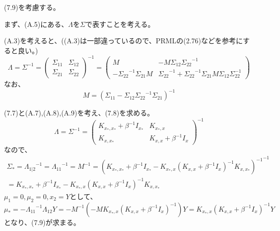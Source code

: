 \documentclass{jsarticle}
\begin{document}
(7.9)を考慮する。

まず、(A.5)にある、$\Lambda$を$\Sigma$で表すことを考える。

(A.3)を考えると、((A.3)は一部違っているので、PRMLの(2.76)などを参考にすると良い。)
\begin{equation}
\Lambda = \Sigma^{-1}
= \begin{pmatrix}
{\Sigma_{11}} & {\Sigma_{12}}\\
{\Sigma_{21}} & {\Sigma_{22}}
\end{pmatrix}^{-1}
= \begin{pmatrix}
M & -M{\Sigma_{12}}{\Sigma_{22}}^{-1}\\
-{\Sigma_{22}}^{-1}{\Sigma_{21}}M & {\Sigma_{22}}^{-1} + {\Sigma_{22}}^{-1}{\Sigma_{21}}M {\Sigma_{12}}{\Sigma_{22}^{-1}}
\end{pmatrix}
\end{equation}
なお、
\begin{equation}
M = ({\Sigma_{11}} - {\Sigma_{12}}{\Sigma_{22}}^{-1}{\Sigma_{21}})^{-1}
\end{equation}

(7.7)と(A.7),(A.8),(A.9)を考え、(7.8)を求める。
\begin{equation}
\Lambda = \Sigma^{-1} = \begin{pmatrix}
K_{x_*, x_*} + \beta^{-1}I_{x_*} & K_{x_*, x} \\
K_{x, x_*} &  K_{x, x} + \beta^{-1}I_{x}
\end{pmatrix}^{-1}
\end{equation}
なので、
\begin{equation}
\begin{split}
\Sigma_* = {\Lambda_{1|2}}^{-1} = {\Lambda_{11}}^{-1} = M^{-1}
= {{(K_{x_*, x_*} + \beta^{-1}I_{x_*} - K_{x_*, x} (K_{x, x} + \beta^{-1}I_{x})^{-1} K_{x, x_*})}^{-1}}^{-1}\\
= K_{x_*, x_*} + \beta^{-1}I_{x_*} - K_{x_*, x} (K_{x, x} + \beta^{-1}I_{x})^{-1} K_{x, x_*}
\end{split}
\end{equation}
$\mu_1 = 0, \mu_2 = 0, x_2 = Y$として、
\begin{equation}
\mu_* = - {\Lambda_{11}}^{-1}\Lambda_{12}Y = -M^{-1}(-M K_{x_*, x} (K_{x, x} + \beta^{-1}I_{x})^{-1})Y
= K_{x_*, x} (K_{x, x} + \beta^{-1}I_{x})^{-1}Y
\end{equation}
となり、(7.9)が求まる。
\end{document}
